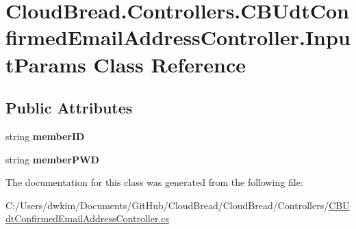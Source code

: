 \hypertarget{class_cloud_bread_1_1_controllers_1_1_c_b_udt_confirmed_email_address_controller_1_1_input_params}{}\section{Cloud\+Bread.\+Controllers.\+C\+B\+Udt\+Confirmed\+Email\+Address\+Controller.\+Input\+Params Class Reference}
\label{class_cloud_bread_1_1_controllers_1_1_c_b_udt_confirmed_email_address_controller_1_1_input_params}
\subsection*{Public Attributes}
\begin{DoxyCompactItemize}
\item 
string {\bfseries member\+ID}\hypertarget{class_cloud_bread_1_1_controllers_1_1_c_b_udt_confirmed_email_address_controller_1_1_input_params_a749b5cc55484232cc8e811b5b1728166}{}\label{class_cloud_bread_1_1_controllers_1_1_c_b_udt_confirmed_email_address_controller_1_1_input_params_a749b5cc55484232cc8e811b5b1728166}

\item 
string {\bfseries member\+P\+WD}\hypertarget{class_cloud_bread_1_1_controllers_1_1_c_b_udt_confirmed_email_address_controller_1_1_input_params_a5789ff7be8d1756df0478e1bcf5c16e9}{}\label{class_cloud_bread_1_1_controllers_1_1_c_b_udt_confirmed_email_address_controller_1_1_input_params_a5789ff7be8d1756df0478e1bcf5c16e9}

\end{DoxyCompactItemize}


The documentation for this class was generated from the following file\+:\begin{DoxyCompactItemize}
\item 
C\+:/\+Users/dwkim/\+Documents/\+Git\+Hub/\+Cloud\+Bread/\+Cloud\+Bread/\+Controllers/\hyperlink{_c_b_udt_confirmed_email_address_controller_8cs}{C\+B\+Udt\+Confirmed\+Email\+Address\+Controller.\+cs}\end{DoxyCompactItemize}
